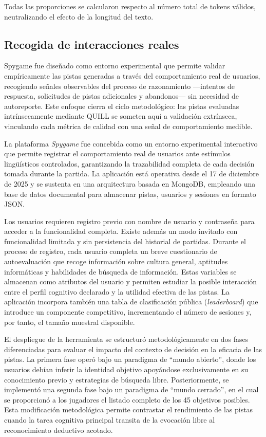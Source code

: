 \documentclass[../main.tex]{subfiles}
\begin{document}
Todas las proporciones se calcularon respecto al número total de tokens válidos, neutralizando el efecto de la longitud del texto.

\subsection{Recogida de interacciones reales}

Spygame fue diseñado como entorno experimental que permite validar empíricamente las pistas generadas a través del comportamiento real de usuarios, recogiendo señales observables del proceso de razonamiento —intentos de respuesta, solicitudes de pistas adicionales y abandonos— sin necesidad de autoreporte. Este enfoque cierra el ciclo metodológico: las pistas evaluadas intrínsecamente mediante QUILL se someten aquí a validación extrínseca, vinculando cada métrica de calidad con una señal de comportamiento medible.

La plataforma \textit{Spygame} fue concebida como un entorno experimental interactivo que permite registrar el comportamiento real de usuarios ante estímulos lingüísticos controlados, garantizando la trazabilidad completa de cada decisión tomada durante la partida. La aplicación está operativa desde el 17 de diciembre de 2025 y se sustenta en una arquitectura basada en MongoDB, empleando una base de datos documental para almacenar pistas, usuarios y sesiones en formato JSON.

Los usuarios requieren registro previo con nombre de usuario y contraseña para acceder a la funcionalidad completa. Existe además un modo invitado con funcionalidad limitada y sin persistencia del historial de partidas. Durante el proceso de registro, cada usuario completa un breve cuestionario de autoevaluación que recoge información sobre cultura general, aptitudes informáticas y habilidades de búsqueda de información. Estas variables se almacenan como atributos del usuario y permiten estudiar la posible interacción entre el perfil cognitivo declarado y la utilidad efectiva de las pistas. La aplicación incorpora también una tabla de clasificación pública (\textit{leaderboard}) que introduce un componente competitivo, incrementando el número de sesiones y, por tanto, el tamaño muestral disponible.

El despliegue de la herramienta se estructuró metodológicamente en dos fases diferenciadas para evaluar el impacto del contexto de decisión en la eficacia de las pistas. La primera fase operó bajo un paradigma de ``mundo abierto'', donde los usuarios debían inferir la identidad objetivo apoyándose exclusivamente en su conocimiento previo y estrategias de búsqueda libre. Posteriormente, se implementó una segunda fase bajo un paradigma de ``mundo cerrado'', en el cual se proporcionó a los jugadores el listado completo de los 45 objetivos posibles. Esta modificación metodológica permite contrastar el rendimiento de las pistas cuando la tarea cognitiva principal transita de la evocación libre al reconocimiento deductivo acotado.
\end{document}
